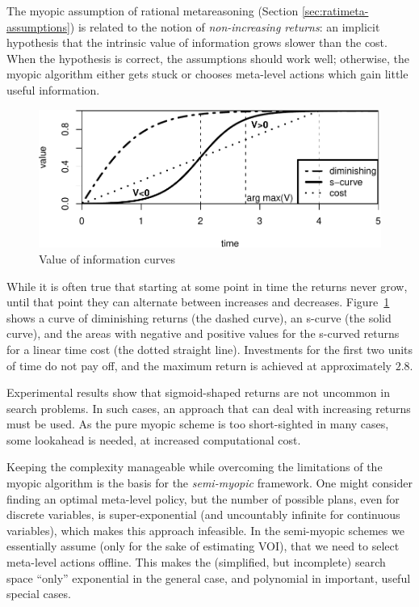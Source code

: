 The myopic assumption of rational metareasoning
(Section \ref{sec:ratimeta-assumptions}) is related to the notion of {\it non-increasing returns}: an implicit hypothesis that the intrinsic
value of information grows slower than the cost. When the hypothesis is correct,
the assumptions should work well; otherwise, the myopic algorithm either
gets stuck or chooses meta-level actions which gain little useful information.

\begin{figure}[h]
\centering
\includegraphics[scale=0.65]{s-curve.pdf}
\caption{Value of information curves} 
\label{fig:greedy-s-curve}
\end{figure} 

While it is often true that starting at
some point in time the returns never grow, until that point they can
alternate between increases and decreases. Figure~\ref{fig:greedy-s-curve}
shows a curve of diminishing returns (the
dashed curve), an s-curve (the solid curve), and the areas with
negative and positive values for the s-curved returns for a linear
time cost (the dotted straight line). Investments for the first two units
of time do not pay off, and the maximum return is achieved at
approximately $2.8$.

Experimental results show \cite{Zilberstein.sensing} that
sigmoid-shaped returns are not uncommon 
in search problems.  In such cases, an approach that can deal
with increasing returns must be used.
As the pure myopic scheme is too short-sighted in many cases,
some lookahead is needed, at increased computational cost.

Keeping the complexity manageable while overcoming the limitations of
the myopic algorithm is the basis for the {\em semi-myopic} framework.
One might consider finding an optimal meta-level policy, but the
number of possible plans, even for discrete variables, is
super-exponential (and uncountably infinite for continuous variables),
which makes this approach infeasible.  In the semi-myopic schemes we
essentially assume (only for the sake of estimating VOI), that we need
to select meta-level actions offline. This makes the (simplified, but
incomplete) search space ``only'' exponential in the general case, and
polynomial in important, useful special cases.

